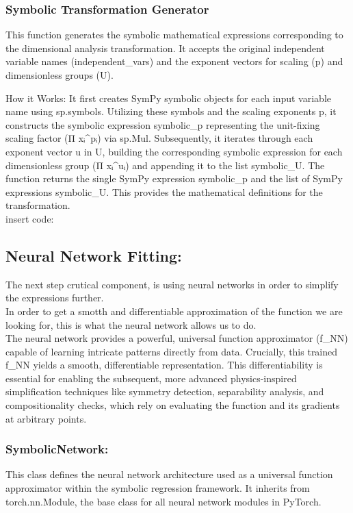 \documentclass{article}
\begin{document}
\subsubsection{Symbolic Transformation Generator}

This function generates the symbolic mathematical expressions corresponding to the dimensional analysis transformation. It accepts the original independent variable names (independent_vars) and the exponent vectors for scaling (p) and dimensionless groups (U).

How it Works: It first creates SymPy symbolic objects for each input variable name using sp.symbols. Utilizing these symbols and the scaling exponents p, it constructs the symbolic expression symbolic_p representing the unit-fixing scaling factor (Π xᵢ^pᵢ) via sp.Mul. Subsequently, it iterates through each exponent vector u in U, building the corresponding symbolic expression for each dimensionless group (Π xᵢ^uᵢ) and appending it to the list symbolic_U. The function returns the single SymPy expression symbolic_p and the list of SymPy expressions symbolic_U. This provides the mathematical definitions for the transformation.\\

insert code:\\

\subsection{Neural Network Fitting: }

The next step crutical component, is using neural networks in order to simplify the expressions further.\\
In order to get a smotth and differentiable approximation of the function we are looking for, this is what the neural network allows us to do.\\ 
The neural network provides a powerful, universal function approximator (f_NN) capable of learning intricate patterns directly from data. Crucially, this trained f_NN yields a smooth, differentiable representation. This differentiability is essential for enabling the subsequent, more advanced physics-inspired simplification techniques like symmetry detection, separability analysis, and compositionality checks, which rely on evaluating the function and its gradients at arbitrary points.\\

\subsubsection{SymbolicNetwork: }
This class defines the neural network architecture used as a universal function approximator within the symbolic regression framework. It inherits from torch.nn.Module, the base class for all neural network modules in PyTorch.
\end{document}
